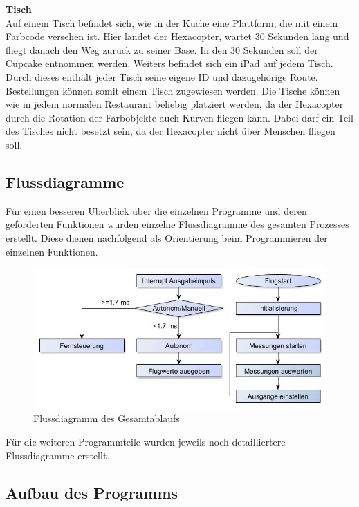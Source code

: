   \textbf{Tisch}\\
  Auf einem Tisch befindet sich, wie in der Küche eine Plattform, die mit einem Farbcode versehen ist. Hier landet der Hexacopter, wartet 30 Sekunden lang und fliegt danach den Weg zurück zu seiner Base. In den 30 Sekunden soll der Cupcake entnommen werden. Weiters befindet sich ein iPad auf jedem Tisch. Durch dieses enthält jeder Tisch seine eigene ID und dazugehörige Route. Bestellungen können somit einem Tisch zugewiesen werden.
  Die Tische können wie in jedem normalen Restaurant beliebig platziert werden, da der Hexacopter durch die Rotation der Farbobjekte auch Kurven fliegen kann. Dabei darf ein Teil des Tisches nicht besetzt sein, da der Hexacopter nicht über Menschen fliegen soll.


  \subsection{Flussdiagramme}
  Für einen besseren Überblick über die einzelnen Programme und deren geforderten Funktionen wurden einzelne Flussdiagramme des gesamten Prozesses erstellt.
  Diese dienen nachfolgend als Orientierung beim Programmieren der einzelnen Funktionen.

  \begin{figure}[tbh]
    \begin{centering}
      \includegraphics[width = \textwidth]{Bilder/Flussdiagramm}
    \par\end{centering}
    \caption{Flussdiagramm des Gesamtablaufs}
    \label{Flussdiragramm}
  \end{figure}

  Für die weiteren Programmteile wurden jeweils noch detailliertere Flussdiagramme erstellt.

  \subsection{Aufbau des Programms}

